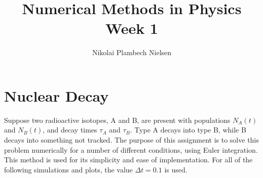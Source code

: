 \documentclass[a4paper,10pt]{article} 	%
\title{Numerical Methods in Physics Week 1}
\author{Nikolai Plambech Nielsen}
\date{}
\numberwithin{equation}{section}
\begin{document}
	\maketitle
	\section{Nuclear Decay}
	Suppose  two radioactive isotopes, A and B, are present with populations $ N_A(t) $ and $ N_B(t) $, and decay times $ \tau_A $  and $ \tau_B $. Type A decays into type B, while B decays into something not tracked. The purpose of this assignment is to solve this problem numerically for a number of different conditions, using Euler integration. This method is used for its simplicity and ease of implementation. For all of the following simulations and plots, the value $ \Delta t = 0.1 $ is used.
	
\end{document}
